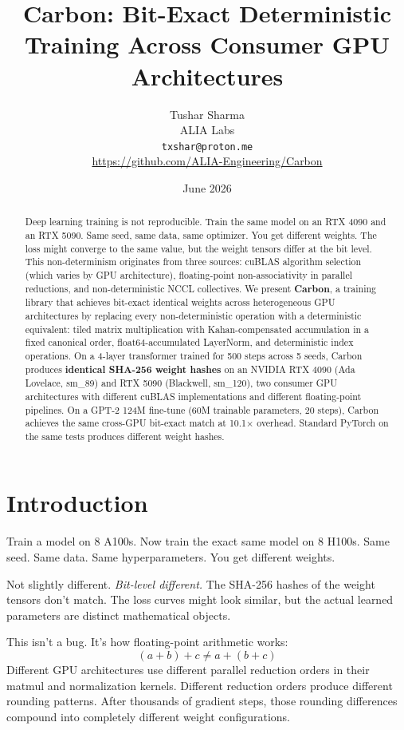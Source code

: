 \documentclass[11pt,a4paper]{article}
\title{Carbon: Bit-Exact Deterministic Training Across Consumer GPU Architectures}
\author{
  Tushar Sharma \\
  ALIA Labs \\
  \texttt{txshar@proton.me} \\
  \url{https://github.com/ALIA-Engineering/Carbon}
}
\date{June 2026}
\begin{document}
\maketitle

\begin{abstract}
Deep learning training is not reproducible. Train the same model on an RTX 4090
and an RTX 5090. Same seed, same data, same optimizer. You get different
weights. The loss might converge to the same value, but the weight tensors differ
at the bit level. This non-determinism originates from three sources: cuBLAS
algorithm selection (which varies by GPU architecture), floating-point
non-associativity in parallel reductions, and non-deterministic NCCL collectives.
We present \textbf{Carbon}, a training library that achieves bit-exact identical
weights across heterogeneous GPU architectures by replacing every
non-deterministic operation with a deterministic equivalent: tiled matrix
multiplication with Kahan-compensated accumulation in a fixed canonical order,
float64-accumulated LayerNorm, and deterministic index operations.
On a 4-layer transformer trained for 500 steps across 5 seeds, Carbon produces
\textbf{identical SHA-256 weight hashes}
on an NVIDIA RTX 4090 (Ada Lovelace, sm\_89) and RTX 5090 (Blackwell, sm\_120), two
consumer GPU architectures with different cuBLAS implementations and different
floating-point pipelines. On a GPT-2 124M fine-tune (60M trainable parameters,
20 steps), Carbon achieves the same cross-GPU bit-exact match at 10.1$\times$
overhead. Standard PyTorch on the same tests produces different weight hashes.
\end{abstract}

\section{Introduction}

Train a model on 8 A100s. Now train the exact same model on 8 H100s. Same seed.
Same data. Same hyperparameters. You get different weights.

Not slightly different. \emph{Bit-level different.} The SHA-256 hashes of the
weight tensors don't match. The loss curves might look similar, but the
actual learned parameters are distinct mathematical objects.

This isn't a bug. It's how floating-point arithmetic works:
\begin{equation}
  (a + b) + c \neq a + (b + c)
\end{equation}
Different GPU architectures use different parallel reduction orders in their
matmul and normalization kernels. Different reduction orders produce different
rounding patterns. After thousands of gradient steps, those rounding differences
compound into completely different weight configurations.
\end{document}
